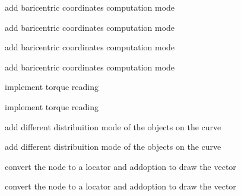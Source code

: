 
\begin{DoxyRefList}
\item[\label{todo__todo000001}%
\hypertarget{todo__todo000001}{}%
Class \hyperlink{class_m_g__cache_value}{M\-G\-\_\-cache\-Value} ]add baricentric coordinates computation mode

add baricentric coordinates computation mode 
\item[\label{todo__todo000002}%
\hypertarget{todo__todo000002}{}%
Class \hyperlink{class_m_g__poly_rivet}{M\-G\-\_\-poly\-Rivet} ]add baricentric coordinates computation mode

add baricentric coordinates computation mode 
\item[\label{todo__todo000003}%
\hypertarget{todo__todo000003}{}%
Class \hyperlink{class_m_g__pose_reader}{M\-G\-\_\-pose\-Reader} ]implement torque reading

implement torque reading 
\item[\label{todo__todo000004}%
\hypertarget{todo__todo000004}{}%
Class \hyperlink{class_m_g__spline_path}{M\-G\-\_\-spline\-Path} ]add different distribuition mode of the objects on the curve

add different distribuition mode of the objects on the curve 
\item[\label{todo__todo000009}%
\hypertarget{todo__todo000009}{}%
Class \hyperlink{class_m_g__vector}{M\-G\-\_\-vector} ]convert the node to a locator and addoption to draw the vector

convert the node to a locator and addoption to draw the vector
\end{DoxyRefList}